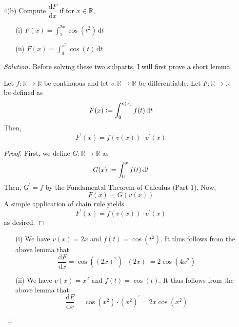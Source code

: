 \documentclass[12pt]{article}
\def\D{\mathrm{d}}
\theoremstyle{definition}
\newenvironment{soln}{\begin{proof}[Solution]}{\end{proof}}
\begin{document}
\begin{enumerate}[leftmargin=*]
    \newpage
    
    \item[4(b)] Compute $\dfrac{\D F}{\D x}$ if for $x \in \mathbb{R}$, 
    \begin{multicols}{2}
    \begin{enumerate}[leftmargin=*]
        \item[(i)] $F(x) = \displaystyle\int_1^{2x} \cos\left( t^2 \right) \, \D t$
        \item[(ii)] $F(x) = \displaystyle\int_0^{x^2} \cos(t) \, \D t$
    \end{enumerate}
    \end{multicols}
    
    \begin{soln}
        Before solving these two subparts, I will first prove a short lemma. 
        \begin{lem*}
            Let $f \colon \mathbb{R} \to \mathbb{R}$ be continuous and let $v \colon \mathbb{R} \to \mathbb{R}$ be differentiable. Let $F \colon \mathbb{R} \to \mathbb{R}$ be defined as
            \[
                F(x) \vcentcolon= \int_{0}^{v(x)} f(t) \, \D t
            \]
            Then, 
            \[
                F^{\prime}(x) = f\left( v(x) \right) \cdot v^{\prime}(x)
            \]
        \end{lem*}
        
        \begin{proof}
            First, we define $G \colon \mathbb{R} \to \mathbb{R}$ as 
            \[
                G(x) \vcentcolon= \int_0^x f(t) \, \D t
            \]
            Then, $G^{\prime} = f$ by the Fundamental Theorem of Calculus (Part $1$). Now,
            \[
                F(x) = G\left( v(x) \right)
            \]
            A simple application of chain rule yields
            \[
                F^{\prime}(x) = f\left( v(x) \right) \cdot v^{\prime}(x)
            \]
            as desired.
        \end{proof}
        
        \begin{enumerate}[leftmargin=*]
            \item[(i)] We have $v(x) = 2x$ and $f(t) = \cos(t^2)$. It thus follows from the above lemma that
            \[
                \frac{\D F}{\D x} = \cos \left( (2x)^2 \right) \cdot \left( 2x \right)^{\prime} = \boxed{2\cos\left( 4x^2 \right)}
            \]
            \item[(ii)] We have $v(x) = x^2$ and $f(t) = \cos(t)$. It thus follows from the above lemma that
            \[
                \frac{\D F}{\D x} = \cos \left( x^2 \right) \cdot \left( x^2 \right)^{\prime}= \boxed{2x \cos\left( x^2 \right)}
            \]
        \end{enumerate}
    \end{soln}
    

\end{enumerate}
\end{document}
